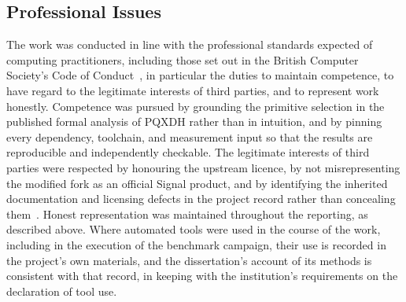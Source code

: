 \subsection{Professional Issues}
\label{subsec:lsepi-professional}

The work was conducted in line with the professional standards expected of computing practitioners, including those set out in the British Computer Society's Code of Conduct~\cite{noauthor_bcs_nodate}, in particular the duties to maintain competence, to have regard to the legitimate interests of third parties, and to represent work honestly. Competence was pursued by grounding the primitive selection in the published formal analysis of PQXDH rather than in intuition, and by pinning every dependency, toolchain, and measurement input so that the results are reproducible and independently checkable. The legitimate interests of third parties were respected by honouring the upstream licence, by not misrepresenting the modified fork as an official Signal product, and by identifying the inherited documentation and licensing defects in the project record rather than concealing them~\cite{noauthor_terms_nodate}. Honest representation was maintained throughout the reporting, as described above. Where automated tools were used in the course of the work, including in the execution of the benchmark campaign, their use is recorded in the project's own materials, and the dissertation's account of its methods is consistent with that record, in keeping with the institution's requirements on the declaration of tool use.